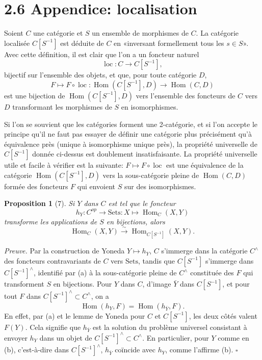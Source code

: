 \documentclass[11pt]{article}
\newcommand{\Hom}{\operatorname{Hom}}
\theoremstyle{deligne}
\newtheorem*{proposition*}{Proposition}
\newenvironment{proofdel}{\noindent\textit{Preuve.}}{\hfill$\square$}
\begin{document}
\section*{2.6 Appendice: localisation}

Soient \(C\) une catégorie et \(S\) un ensemble de morphismes de \(C\). La catégorie localisée \(C[S^{-1}]\) est déduite de \(C\) en «inversant formellement tous les \(s\in S\)». Avec cette définition, il est clair que l'on a un foncteur naturel
\[
\operatorname{loc}:C\longrightarrow C[S^{-1}],
\]
bijectif sur l'ensemble des objets, et que, pour toute catégorie \(D\),
\[
F\longmapsto F\circ\operatorname{loc}:\Hom(C[S^{-1}],D)\longrightarrow\Hom(C,D)
\]
est une bijection de \(\Hom(C[S^{-1}],D)\) vers l'ensemble des foncteurs de \(C\) vers \(D\) transformant les morphismes de \(S\) en isomorphismes.

Si l'on se souvient que les catégories forment une 2-catégorie, et si l'on accepte le principe qu'il ne faut pas essayer de définir une catégorie plus précisément qu'à équivalence près (unique à isomorphisme unique près), la propriété universelle de \(C[S^{-1}]\) donnée ci-dessus est doublement insatisfaisante. La propriété universelle utile et facile à vérifier est la suivante: \(F\mapsto F\circ\operatorname{loc}\) est une équivalence de la catégorie \(\Hom(C[S^{-1}],D)\) vers la sous-catégorie pleine de \(\Hom(C,D)\) formée des foncteurs \(F\) qui envoient \(S\) sur des isomorphismes.

\begin{proposition*}[7]
Si \(Y\) dans \(C\) est tel que le foncteur
\[
h_Y:C^{op}\longrightarrow \mathrm{Sets}:X\longmapsto\Hom_C(X,Y)
\]
transforme les applications de \(S\) en bijections, alors
\[
\Hom_C(X,Y)\overset{\sim}{\longrightarrow}\Hom_{C[S^{-1}]}(X,Y).
\]
\end{proposition*}

\begin{proofdel}
Par la construction de Yoneda \(Y\mapsto h_Y\), \(C\) s'immerge dans la catégorie \(C^\wedge\) des foncteurs contravariants de \(C\) vers \(\mathrm{Sets}\), tandis que \(C[S^{-1}]\) s'immerge dans \(C[S^{-1}]^\wedge\), identifié par (a) à la sous-catégorie pleine de \(C^\wedge\) constituée des \(F\) qui transforment \(S\) en bijections. Pour \(Y\) dans \(C\), d'image \(\bar Y\) dans \(C[S^{-1}]\), et pour tout \(F\) dans \(C[S^{-1}]^\wedge\subset C^\wedge\), on a
\[
\Hom(h_Y,F)=\Hom(h_{\bar Y},F).
\]
En effet, par (a) et le lemme de Yoneda pour \(C\) et \(C[S^{-1}]\), les deux côtés valent \(F(Y)\). Cela signifie que \(h_{\bar Y}\) est la solution du problème universel consistant à envoyer \(h_Y\) dans un objet de \(C[S^{-1}]^\wedge\subset C^\wedge\). En particulier, pour \(Y\) comme en (b), c'est-à-dire dans \(C[S^{-1}]^\wedge\), \(h_{\bar Y}\) coïncide avec \(h_Y\), comme l'affirme (b).
\end{proofdel}
\end{document}
